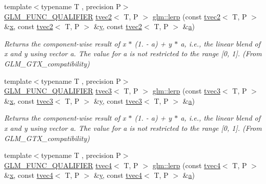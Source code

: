 \begin{DoxyCompactItemize}
{\footnotesize template$<$typename T , precision P$>$ }\\\mbox{\hyperlink{setup_8hpp_a33fdea6f91c5f834105f7415e2a64407}{G\+L\+M\+\_\+\+F\+U\+N\+C\+\_\+\+Q\+U\+A\+L\+I\+F\+I\+ER}} \mbox{\hyperlink{structglm_1_1tvec2}{tvec2}}$<$ T, P $>$ \mbox{\hyperlink{group__gtx__compatibility_ga7609b44d8aefc5a277efe73395ff4070}{glm\+::lerp}} (const \mbox{\hyperlink{structglm_1_1tvec2}{tvec2}}$<$ T, P $>$ \&\mbox{\hyperlink{glad_8h_a92d0386e5c19fb81ea88c9f99644ab1d}{x}}, const \mbox{\hyperlink{structglm_1_1tvec2}{tvec2}}$<$ T, P $>$ \&\mbox{\hyperlink{glad_8h_a66ddd433d2cacfe27f5906b7e86faeed}{y}}, const \mbox{\hyperlink{structglm_1_1tvec2}{tvec2}}$<$ T, P $>$ \&\mbox{\hyperlink{glad_8h_ac8729153468b5dcf13f971b21d84d4e5}{a}})
\begin{DoxyCompactList}\small\item\em Returns the component-\/wise result of x $\ast$ (1. -\/ a) + y $\ast$ a, i.\+e., the linear blend of x and y using vector a. The value for a is not restricted to the range \mbox{[}0, 1\mbox{]}. (From G\+L\+M\+\_\+\+G\+T\+X\+\_\+compatibility) \end{DoxyCompactList}\item 
{\footnotesize template$<$typename T , precision P$>$ }\\\mbox{\hyperlink{setup_8hpp_a33fdea6f91c5f834105f7415e2a64407}{G\+L\+M\+\_\+\+F\+U\+N\+C\+\_\+\+Q\+U\+A\+L\+I\+F\+I\+ER}} \mbox{\hyperlink{structglm_1_1tvec3}{tvec3}}$<$ T, P $>$ \mbox{\hyperlink{group__gtx__compatibility_ga90a1d1364a8d078846857178bdcc9af1}{glm\+::lerp}} (const \mbox{\hyperlink{structglm_1_1tvec3}{tvec3}}$<$ T, P $>$ \&\mbox{\hyperlink{glad_8h_a92d0386e5c19fb81ea88c9f99644ab1d}{x}}, const \mbox{\hyperlink{structglm_1_1tvec3}{tvec3}}$<$ T, P $>$ \&\mbox{\hyperlink{glad_8h_a66ddd433d2cacfe27f5906b7e86faeed}{y}}, const \mbox{\hyperlink{structglm_1_1tvec3}{tvec3}}$<$ T, P $>$ \&\mbox{\hyperlink{glad_8h_ac8729153468b5dcf13f971b21d84d4e5}{a}})
\begin{DoxyCompactList}\small\item\em Returns the component-\/wise result of x $\ast$ (1. -\/ a) + y $\ast$ a, i.\+e., the linear blend of x and y using vector a. The value for a is not restricted to the range \mbox{[}0, 1\mbox{]}. (From G\+L\+M\+\_\+\+G\+T\+X\+\_\+compatibility) \end{DoxyCompactList}\item 
{\footnotesize template$<$typename T , precision P$>$ }\\\mbox{\hyperlink{setup_8hpp_a33fdea6f91c5f834105f7415e2a64407}{G\+L\+M\+\_\+\+F\+U\+N\+C\+\_\+\+Q\+U\+A\+L\+I\+F\+I\+ER}} \mbox{\hyperlink{structglm_1_1tvec4}{tvec4}}$<$ T, P $>$ \mbox{\hyperlink{group__gtx__compatibility_gae4b0244b0d882657bed0a99dfa33f379}{glm\+::lerp}} (const \mbox{\hyperlink{structglm_1_1tvec4}{tvec4}}$<$ T, P $>$ \&\mbox{\hyperlink{glad_8h_a92d0386e5c19fb81ea88c9f99644ab1d}{x}}, const \mbox{\hyperlink{structglm_1_1tvec4}{tvec4}}$<$ T, P $>$ \&\mbox{\hyperlink{glad_8h_a66ddd433d2cacfe27f5906b7e86faeed}{y}}, const \mbox{\hyperlink{structglm_1_1tvec4}{tvec4}}$<$ T, P $>$ \&\mbox{\hyperlink{glad_8h_ac8729153468b5dcf13f971b21d84d4e5}{a}})

\end{DoxyCompactItemize}
